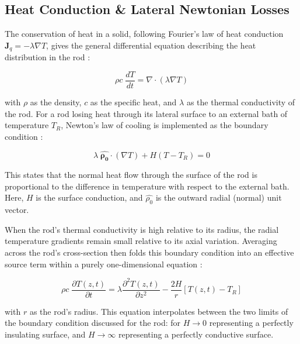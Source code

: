 \documentclass[11pt, a4paper, twocolumn]{article}
\begin{document}
\subsection{Heat Conduction \& Lateral Newtonian Losses} \label{sec:1.1}

The conservation of heat in a solid, following Fourier's law of heat conduction $\mathbf{J}_q=-\lambda\nabla T$, gives the general differential equation describing the heat distribution in the rod \cite{rafols1992heat,diaz1990heat}:

\vspace{-3ex}
\begin{equation} \label{eq:1}
  \rho c \; \frac{dT}{dt} = \nabla \cdot (\lambda \nabla T)
\end{equation}

with $\rho$ as the density, $c$ as the specific heat, and $\lambda$ as the thermal conductivity of the rod. For a rod losing heat through its lateral surface to an external bath of temperature $T_R$, Newton's law of cooling is implemented as the boundary condition \cite{rafols1992heat,diaz1990heat}:

\vspace{-3ex}
\begin{equation} \label{eq:2}
  \lambda \; \mathbf{\hat{\rho_0}} \cdot (\nabla T) + H(T-T_R) = 0
\end{equation}

This states that the normal heat flow through the surface of the rod is proportional to the difference in temperature with respect to the external bath. Here, $H$ is the surface conduction, and $\hat{\rho_0}$ is the outward radial (normal) unit vector. \cite{diaz1990heat,rafols1992heat}

When the rod's thermal conductivity is high relative to its radius, the radial temperature gradients remain small relative to its axial variation. Averaging across the rod's cross-section then folds this boundary condition into an effective source term within a purely one-dimensional equation \cite{diaz1990heat,rafols1992heat}:

\vspace{-3ex}
\begin{equation} \label{eq:3}
  \rho c \; \frac{\partial T(z,t)}{\partial t} = \lambda \frac{\partial^2 T(z,t)}{\partial z^2} - \frac{2H}{r} [T(z,t)-T_R]
\end{equation}

with $r$ as the rod's radius. This equation interpolates between the two limits of the boundary condition discussed for the rod: for $H \to 0$ representing a perfectly insulating surface, and $H\to \infty$ representing a perfectly conductive surface. \cite{rafols1992heat}
\end{document}
